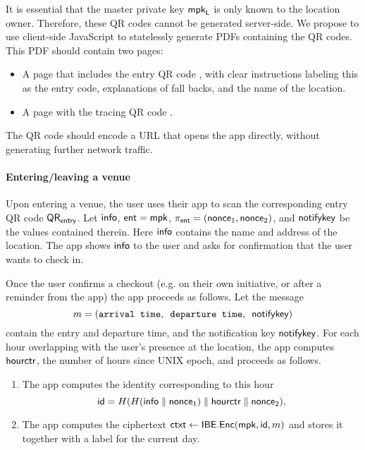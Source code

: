  It is essential that the master private key $\textsf{mpk}_{\textsf{L}}$ is only known to the location owner. Therefore, these QR codes cannot be generated server-side. We propose to use client-side JavaScript to statelessly generate PDFs containing the QR codes. This PDF should contain two pages:
\begin{itemize}
\item A page that includes the entry QR code \qrentry, with clear instructions labeling this as the entry code, explanations of fall backs, and the name of the location.
\item A page with the tracing QR code \qrtrace.
\end{itemize}

The QR code should encode a URL that opens the app directly, without generating further network traffic.

\paragraph{Entering/leaving a venue} Upon entering a venue, the user uses their app to scan the corresponding entry QR code $\textsf{QR}_{\textsf{entry}}$.
Let $\textsf{info}$, $\textsf{ent} = \textsf{mpk}$, $\pi_{\textsf{ent}} = (\textsf{nonce}_1, \textsf{nonce}_2)$, and $\textsf{notifykey}$ be the values contained therein. Here $\textsf{info}$ contains the name and address of the location. The app shows $\textsf{info}$ to the user and asks for confirmation that the user wants to check in.

\newcommand{\hourctr}{\code{hourctr}}
Once the user confirms a checkout (e.g. on their own initiative, or after a reminder from the app) the app proceeds as follows. Let the message
\begin{equation*}
  m = (\texttt{arrival time},\enspace \texttt{departure time},\enspace \textsf{notifykey})
\end{equation*}
contain the entry and departure time, and the notification key $\textsf{notifykey}$. For each hour overlapping with the user's presence at the location, the app computes $\hourctr$, the number of hours since UNIX epoch, and proceeds as follows.
\begin{enumerate}
\item The app computes the identity corresponding to this hour
  \begin{equation*}
    \id = \hash( \hash(\info \parallel \nonce_1) \parallel \hourctr \parallel \nonce_2),
  \end{equation*}
 \item The app computes the ciphertext $\textsf{ctxt} \gets \textsf{IBE.Enc}(\textsf{mpk}, \textsf{id}, m)$ and stores it together with a label for the current day.
\end{enumerate}

